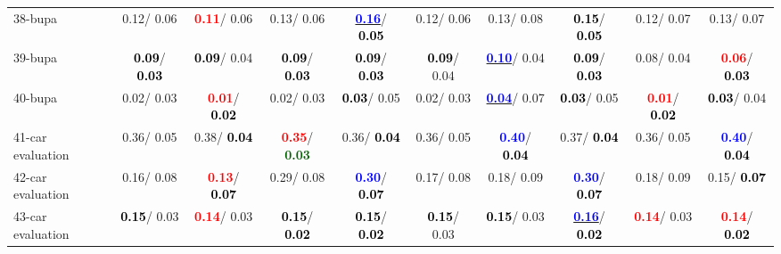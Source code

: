 \begin{table}[h]
\begin{center}
{\begin{tabular}{lc|c|c|c|c|c|c|c|c}
38-bupa &   0.12/  0.06 & \textcolor{red}{\textbf{  0.11}}/  0.06 &   0.13/  0.06 & \underline{\textcolor{blue}{\textbf{  0.16}}}/\textcolor{black}{\textbf{  0.05}} &   0.12/  0.06 &   0.13/  0.08 & \textcolor{black}{\textbf{  0.15}}/\textcolor{black}{\textbf{  0.05}} &   0.12/  0.07 &   0.13/  0.07 \\
39-bupa & \textcolor{black}{\textbf{  0.09}}/\textcolor{black}{\textbf{  0.03}} & \textcolor{black}{\textbf{  0.09}}/  0.04 & \textcolor{black}{\textbf{  0.09}}/\textcolor{black}{\textbf{  0.03}} & \textcolor{black}{\textbf{  0.09}}/\textcolor{black}{\textbf{  0.03}} & \textcolor{black}{\textbf{  0.09}}/  0.04 & \underline{\textcolor{blue}{\textbf{  0.10}}}/  0.04 & \textcolor{black}{\textbf{  0.09}}/\textcolor{black}{\textbf{  0.03}} &   0.08/  0.04 & \textcolor{red}{\textbf{  0.06}}/\textcolor{black}{\textbf{  0.03}} \\ \hline
40-bupa &   0.02/  0.03 & \textcolor{red}{\textbf{  0.01}}/\textcolor{black}{\textbf{  0.02}} &   0.02/  0.03 & \textcolor{black}{\textbf{  0.03}}/  0.05 &   0.02/  0.03 & \underline{\textcolor{blue}{\textbf{  0.04}}}/  0.07 & \textcolor{black}{\textbf{  0.03}}/  0.05 & \textcolor{red}{\textbf{  0.01}}/\textcolor{black}{\textbf{  0.02}} & \textcolor{black}{\textbf{  0.03}}/  0.04 \\
41-car evaluation &   0.36/  0.05 &   0.38/\textcolor{black}{\textbf{  0.04}} & \textcolor{red}{\textbf{  0.35}}/\textcolor{darkgreen}{\textbf{  0.03}} &   0.36/\textcolor{black}{\textbf{  0.04}} &   0.36/  0.05 & \textcolor{blue}{\textbf{  0.40}}/\textcolor{black}{\textbf{  0.04}} &   0.37/\textcolor{black}{\textbf{  0.04}} &   0.36/  0.05 & \textcolor{blue}{\textbf{  0.40}}/\textcolor{black}{\textbf{  0.04}} \\
42-car evaluation &   0.16/  0.08 & \textcolor{red}{\textbf{  0.13}}/\textcolor{black}{\textbf{  0.07}} &   0.29/  0.08 & \textcolor{blue}{\textbf{  0.30}}/\textcolor{black}{\textbf{  0.07}} &   0.17/  0.08 &   0.18/  0.09 & \textcolor{blue}{\textbf{  0.30}}/\textcolor{black}{\textbf{  0.07}} &   0.18/  0.09 &   0.15/\textcolor{black}{\textbf{  0.07}} \\
43-car evaluation & \textcolor{black}{\textbf{  0.15}}/  0.03 & \textcolor{red}{\textbf{  0.14}}/  0.03 & \textcolor{black}{\textbf{  0.15}}/\textcolor{black}{\textbf{  0.02}} & \textcolor{black}{\textbf{  0.15}}/\textcolor{black}{\textbf{  0.02}} & \textcolor{black}{\textbf{  0.15}}/  0.03 & \textcolor{black}{\textbf{  0.15}}/  0.03 & \underline{\textcolor{blue}{\textbf{  0.16}}}/\textcolor{black}{\textbf{  0.02}} & \textcolor{red}{\textbf{  0.14}}/  0.03 & \textcolor{red}{\textbf{  0.14}}/\textcolor{black}{\textbf{  0.02}} \\

\end{tabular}}
\end{center}
\end{table}
